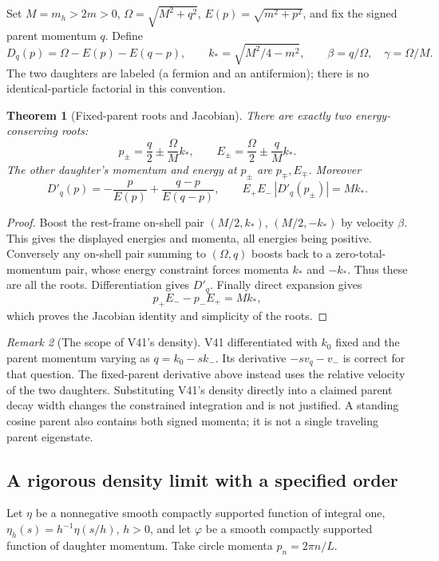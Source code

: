 \documentclass[11pt]{article}
\newtheorem{theorem}{Theorem}[section]
\theoremstyle{remark}
\newtheorem{remark}[theorem]{Remark}
\begin{document}
Set \(M=m_h>2m>0\), \(\Omega=\sqrt{M^2+q^2}\),
\(E(p)=\sqrt{m^2+p^2}\), and fix the signed parent momentum \(q\).
Define
\[
 D_q(p)=\Omega-E(p)-E(q-p),\qquad
 k_*=\sqrt{M^2/4-m^2},\qquad
 \beta=q/\Omega,\quad \gamma=\Omega/M .
\]
The two daughters are labeled (a fermion and an antifermion); there
is no identical-particle factorial in this convention.

\begin{theorem}[Fixed-parent roots and Jacobian]
\label{thm:v20v42-roots}
There are exactly two energy-conserving roots:
\[
 p_\pm=\frac q2\pm\frac{\Omega}{M}k_*,
 \qquad E_\pm=\frac{\Omega}{2}\pm\frac qM k_*.
\]
The other daughter's momentum and energy at \(p_\pm\) are \(p_\mp,E_\mp\).
Moreover
\[
 D'_q(p)=-\frac p{E(p)}+\frac{q-p}{E(q-p)},\qquad
 E_+E_-\,|D'_q(p_\pm)|=M k_*.
\]
\end{theorem}
\begin{proof}
Boost the rest-frame on-shell pair
\((M/2,k_*)\), \((M/2,-k_*)\) by velocity \(\beta\).
This gives the displayed energies and momenta, all energies being
positive.  Conversely any on-shell pair summing to \((\Omega,q)\)
boosts back to a zero-total-momentum pair, whose energy constraint
forces momenta \(k_*\) and \(-k_*\).  Thus these are all the roots.
Differentiation gives \(D'_q\).  Finally direct expansion gives
\[
 p_+E_--p_-E_+=M k_*,
\]
which proves the Jacobian identity and simplicity of the roots.
\end{proof}

\begin{remark}[The scope of V41's density]
\label{rem:v20v42-density}
V41 differentiated with \(k_0\) fixed and the parent momentum varying
as \(q=k_0-sk_-\).  Its derivative \(-s v_q-v_-\) is correct for that
question.  The fixed-parent derivative above instead uses the relative
velocity of the two daughters.  Substituting V41's density directly
into a claimed parent decay width changes the constrained integration
and is not justified.  A standing cosine parent also contains both
signed momenta; it is not a single traveling parent eigenstate.
\end{remark}

\subsection{A rigorous density limit with a specified order}

Let \(\eta\) be a nonnegative smooth compactly supported function of
integral one, \(\eta_h(s)=h^{-1}\eta(s/h)\), \(h>0\), and let
\(\varphi\) be a smooth compactly supported function of daughter
momentum.  Take circle momenta \(p_n=2\pi n/L\).
\end{document}

